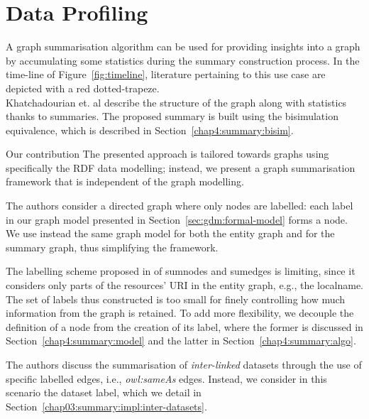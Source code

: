 
\section{Data Profiling}
\label{chap03:review:query-profiling}

A graph summarisation algorithm can be used for providing insights into a graph by accumulating some statistics during the summary construction process. In the time-line of Figure~\ref{fig:timeline}, literature pertaining to this use case are depicted with a red dotted-trapeze.\\

Khatchadourian et. al \cite{khatchadourian:2010:eswc} describe the structure of the graph along with statistics thanks to summaries. The proposed summary is built using the bisimulation equivalence, which is described in Section~\ref{chap4:summary:bisim}.

\begin{centeremph}{Our contribution}
	The presented approach is tailored towards graphs using specifically the RDF data modelling; instead, we present a graph summarisation framework that is independent of the graph modelling.

	The authors consider a directed graph where only nodes are labelled: each label in our graph model presented in Section~\ref{sec:gdm:formal-model} forms a node. We use instead the same graph model for both the entity graph and for the summary graph, thus simplifying the framework.

	The labelling scheme proposed in \cite{khatchadourian:2010:eswc} of sumnodes and sumedges is limiting, since it considers only parts of the resources' URI in the entity graph, e.g., the localname. The set of labels thus constructed is too small for finely controlling how much information from the graph is retained. To add more flexibility, we decouple the definition of a node from the creation of its label, where the former is discussed in Section~\ref{chap4:summary:model} and the latter in Section~\ref{chap4:summary:algo}.

	The authors discuss the summarisation of \emph{inter-linked} datasets through the use of specific labelled edges, i.e., \emph{owl:sameAs} edges. Instead, we consider in this scenario the dataset label, which we detail in Section~\ref{chap03:summary:impl:inter-datasets}.
\end{centeremph}


